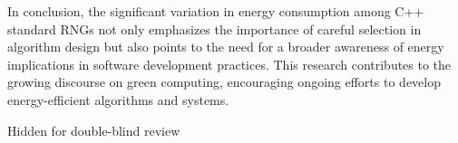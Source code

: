 \documentclass[sigconf]{acmart}
\begin{document}
In conclusion, the significant variation in energy consumption among C++ standard RNGs not only emphasizes the importance of careful selection in algorithm design but also points to the need for a broader awareness of energy implications in software development practices. This research contributes to the growing discourse on green computing, encouraging ongoing efforts to develop energy-efficient algorithms and systems.

\begin{acks}
Hidden for double-blind review
\end{acks}



\end{document}

